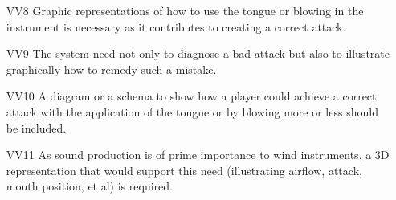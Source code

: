 \begin{itemize}
\item[VV8] Graphic representations of how to use the tongue or blowing in the instrument is necessary as it contributes to creating a correct attack.
\item[VV9] The system need not only to diagnose a bad attack but also to illustrate graphically how to remedy such a mistake.
\item[VV10] A diagram or a schema to show how a player could achieve a correct attack with the application of the tongue or by blowing more or less should be included.
\item[VV11] As sound production is of prime importance to wind instruments, a 3D representation that would support this need (illustrating airflow, attack, mouth position, et al) is required.
\end{itemize}


